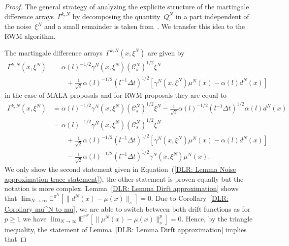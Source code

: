 \begin{proof}
  The general strategy of analyzing the explicite structure of the martingale difference arrays~$\Gamma^{k,N}$ by decomposing the quantity~$Q^N_{\cdot}$ in a part independent of the noise~$\xi^N$ and a small remainder is taken from~\autocite[Lemma 4.8]{Pillai2012}. We transfer this idea to the RWM algorithm.
  
  The martingale difference arrays~$\Gamma^{k,N}(x, \xi^N)$ are given by
  \begin{equation}
    \label{DLR: Lemma Noise approximation - Gamma MALA}
    \begin{split}
      \Gamma^{k,N}(x, \xi^N) & = \alpha(l)^{-1/2} \gamma^N(x, \xi^N) (\mathcal{C}_s^N)^{1/2} \xi^N \\
      & \qquad +\frac{1}{\sqrt{2}} \alpha(l)^{-1/2} (l^{-1}\Delta t)^{1/2} \left[\gamma^N(x, \xi^N) \mu^N(x) - \alpha(l) d^N(x)  \right]
    \end{split}
  \end{equation}
  in the case of MALA proposals and for RWM proposals they are equal to
   \begin{equation}
    \label{DLR: Lemma Noise approximation - Gamma RWM}
    \begin{split}
      \Gamma^{k,N}(x, \xi^N) & = \alpha(l)^{-1/2} \gamma^N(x, \xi^N) (\mathcal{C}_s^N)^{1/2} \xi^N  -\frac{1}{\sqrt{2}} \alpha(l)^{-1/2} (l^{-1}\Delta t)^{1/2}  \alpha(l) d^N(x)\\
      & = \alpha(l)^{-1/2} \gamma^N(x, \xi^N) (\mathcal{C}_s^N)^{1/2} \xi^N \\
      & \qquad +\frac{1}{\sqrt{2}} \alpha(l)^{-1/2} (l^{-1}\Delta t)^{1/2} \left[\gamma^N(x, \xi^N) \mu^N(x) - \alpha(l) d^N(x)  \right]\\
      & \qquad -\frac{1}{\sqrt{2}} \alpha(l)^{-1/2} (l^{-1}\Delta t)^{1/2} \gamma^N(x, \xi^N) \mu^N(x) .
    \end{split}
  \end{equation}
  We only show the second statement given in Equation~(\ref{DLR: Lemma Noise approximation trace statement}), the other statement is proven equally but the notation is more complex. Lemma~\ref{DLR: Lemma Dirft approximation} shows that $\lim_{N \to \infty} \mathbb{E}^{\pi^N}[ \|  d^N(x) - \mu(x) \|_{s} ] = 0$. Due to Corollary~\ref{DLR: Corollary mu^N to mu}, we are able to switch between both drift functions as for $p\geq1$ we have $ \lim_{N \to \infty} \mathbb{E}^{\pi^N}[ \|  \mu^N(x) - \mu(x)\|_{s}^p] = 0$. Hence, by the triangle inequality, the statement of Lemma~\ref{DLR: Lemma Dirft approximation} implies that

\end{proof}

